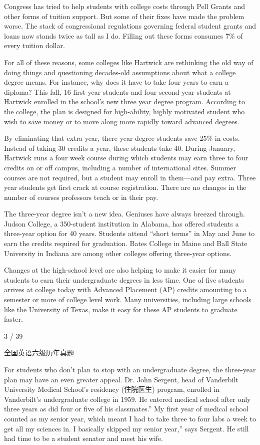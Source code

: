 \documentclass[UTF8,11pt]{ctexart}
\begin{document}
Congress has tried to help students with college costs through Pell Grants and other forms of tuition support. But some of their fixes have made the problem worse. The stack of congressional regulations governing federal student grants and loans now stands twice as tall as I do. Filling out these forms consumes 7\% of every tuition dollar.


For all of these reasons, some colleges like Hartwick are rethinking the old way of doing things and questioning decades-old assumptions about what a college degree means. For instance, why does it have to take four years to earn a diploma? This fall, 16 first-year students and four second-year students at Hartwick enrolled in the school’s new three year degree program. According to the college, the plan is designed for high-ability, highly motivated student who wish to save money or to move along more rapidly toward advanced degrees.


By eliminating that extra year, there year degree students save 25\% in costs. Instead of taking 30 credits a year, these students take 40. During January, Hartwick runs a four week course during which students may earn three to four credits on or off campus, including a number of international sites. Summer courses are not required, but a student may enroll in them—and pay extra. Three year students get first crack at course registration. There are no changes in the number of courses professors teach or in their pay.


The three-year degree isn’t a new idea. Geniuses have always breezed through. Judson College, a 350-student institution in Alabama, has offered students a three-year option for 40 years. Students attend “short terms” in May and June to earn the credits required for graduation. Bates College in Maine and Ball State University in Indiana are among other colleges offering three-year options.


Changes at the high-school level are also helping to make it easier for many students to earn their undergraduate degrees in less time. One of five students arrives at college today with Advanced Placement (AP) credits amounting to a semester or more of college level work. Many universities, including large schools like the University of Texas, make it easy for these AP students to graduate faster.


3 / 39


全国英语六级历年真题


For students who don’t plan to stop with an undergraduate degree, the three-year plan may have an even greater appeal. Dr. John Sergent, head of Vanderbilt University Medical School’s residency (住院医生) program, enrolled in Vanderbilt’s undergraduate college in 1959. He entered medical school after only three years as did four or five of his classmates.” My first year of medical school counted as my senior year, which meant I had to take three to four labs a week to get all my sciences in. I basically skipped my senior year,” says Sergent. He still had time to be a student senator and meet his wife.
\end{document}
